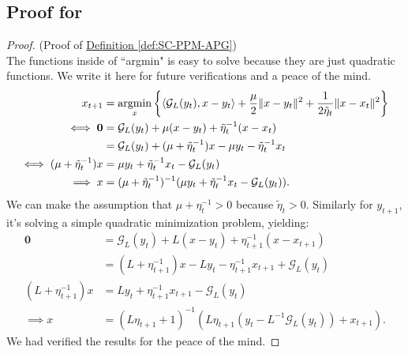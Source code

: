 \documentclass[12pt]{article}
\begin{document}
    \subsection{Proof for \SCPPMAPG}\label{proof:derivations-SC-PPM-AGP}
        \begin{proof}
            (Proof of 
            \hyperref[def:SC-PPM-APG]
            {Definition \ref*{def:SC-PPM-APG}})
            \\
            The functions inside of ``argmin" is easy to solve because they are just quadratic functions. 
            We write it here for future verifications and a peace of the mind. 
            \begin{align*}
                x_{t + 1} &= \mathop{\rm argmin}\limits_{x}\left\lbrace
                    \langle \mathcal G_L(y_t), x - y_t\rangle 
                    + 
                    \frac{\mu}{2}\Vert x - y_t\Vert^2 +  
                    \frac{1}{2\tilde \eta_{t}}\Vert x - x_t\Vert^2
                \right\rbrace
                \\
                \iff 
                \mathbf 0 & = 
                \mathcal G_L(y_t) + \mu(x - y_t) + \tilde \eta_{t}^{-1}(x - x_t)
                \\
                &= 
                \mathcal G_L(y_t) + (\mu + \tilde \eta_{t}^{-1}) x - \mu y_t - \tilde \eta_{t}^{-1} x_t
                \\
                \iff 
                (\mu + \tilde \eta_{t}^{-1})x 
                &= 
                \mu y_t + \tilde \eta_{t}^{-1} x_t - \mathcal G_L(y_t)
                \\
                \implies 
                x &= (\mu + \tilde \eta_{t}^{-1})^{-1 }
                (\mu y_t + \tilde \eta_{t}^{-1} x_t - \mathcal G_L(y_t)). 
            \end{align*}
            We can make the assumption that $\mu + \eta_{t}^{-1} > 0$ because $\tilde\eta_t > 0$. 
            Similarly for $y_{t + 1}$, it's solving a simple quadratic minimization problem, yielding: 
            \begin{align*}
                \mathbf 0 &= \mathcal G_L(y_t) + L(x - y_t) + \eta_{t + 1}^{-1}(x - x_{t + 1})
                \\
                &= (L + \eta_{t + 1}^{-1})x - L y_t - \eta_{t + 1}^{-1}x_{t + 1} + \mathcal G_L(y_t) 
                \\
                (L + \eta_{t + 1}^{-1})x &= 
                Ly_t + \eta_{t + 1}^{-1} x_{t + 1} - \mathcal G_L(y_t)
                \\
                \implies 
                x &= 
                (L\eta_{t + 1} + 1)^{-1}(L\eta_{t + 1}(y_t - L^{-1}\mathcal G_L(y_t)) + x_{t + 1}). 
            \end{align*}
            We had verified the results for the peace of the mind. 
        \end{proof}
\end{document}

